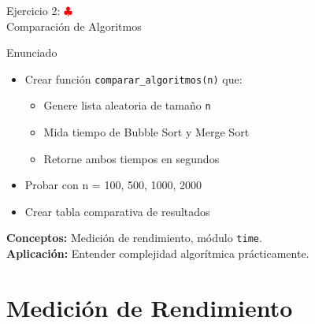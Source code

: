 \documentclass[10pt]{beamer}
\begin{document}
\begin{frame}{Ejercicio 2: \hfill \textcolor{red}{$\clubsuit$} \\ Comparación de Algoritmos}
  \begin{block}{Enunciado}
    \begin{itemize}
      \item Crear función \texttt{comparar\_algoritmos(n)} que:
        \begin{itemize}
          \item Genere lista aleatoria de tamaño \texttt{n}
          \item Mida tiempo de Bubble Sort y Merge Sort
          \item Retorne ambos tiempos en segundos
        \end{itemize}
      \item Probar con n = 100, 500, 1000, 2000
      \item Crear tabla comparativa de resultados
    \end{itemize}
  \end{block}
  
  \textbf{Conceptos:} Medición de rendimiento, módulo \texttt{time}.
  \\
  \textbf{Aplicación:} Entender complejidad algorítmica prácticamente.
\end{frame}

\section{Medición de Rendimiento}
\end{document}
